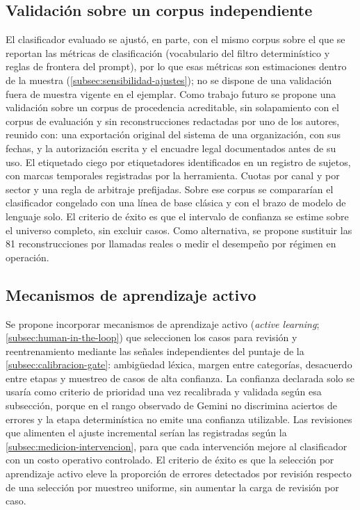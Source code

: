 \subsection{Validación sobre un corpus independiente}\label{subsec:corpus-independiente}

El clasificador evaluado se ajustó, en parte, con el mismo corpus sobre el que se reportan las métricas de clasificación (vocabulario del filtro determinístico y reglas de frontera del prompt), por lo que esas métricas son estimaciones dentro de la muestra (\autoref{subsec:sensibilidad-ajustes}); no se dispone de una validación fuera de muestra vigente en el ejemplar. Como trabajo futuro se propone una validación sobre un corpus de procedencia acreditable, sin solapamiento con el corpus de evaluación y sin reconstrucciones redactadas por uno de los autores, reunido con: una exportación original del sistema de una organización, con sus fechas, y la autorización escrita y el encuadre legal documentados antes de su uso. El etiquetado ciego por etiquetadores identificados en un registro de sujetos, con marcas temporales registradas por la herramienta. Cuotas por canal y por sector y una regla de arbitraje prefijadas. Sobre ese corpus se compararían el clasificador congelado con una línea de base clásica y con el brazo de modelo de lenguaje solo. El criterio de éxito es que el intervalo de confianza se estime sobre el universo completo, sin excluir casos. Como alternativa, se propone sustituir las 81 reconstrucciones por llamadas reales o medir el desempeño por régimen en operación.

\subsection{Mecanismos de aprendizaje activo}\label{subsec:aprendizaje-activo}

Se propone incorporar mecanismos de aprendizaje activo (\emph{active learning}; \autoref{subsec:human-in-the-loop}) que seleccionen los casos para revisión y reentrenamiento mediante las señales independientes del puntaje de la \autoref{subsec:calibracion-gate}: ambigüedad léxica, margen entre categorías, desacuerdo entre etapas y muestreo de casos de alta confianza. La confianza declarada solo se usaría como criterio de prioridad una vez recalibrada y validada según esa subsección, porque en el rango observado de Gemini no discrimina aciertos de errores y la etapa determinística no emite una confianza utilizable. Las revisiones que alimenten el ajuste incremental serían las registradas según la \autoref{subsec:medicion-intervencion}, para que cada intervención mejore al clasificador con un costo operativo controlado. El criterio de éxito es que la selección por aprendizaje activo eleve la proporción de errores detectados por revisión respecto de una selección por muestreo uniforme, sin aumentar la carga de revisión por caso.

